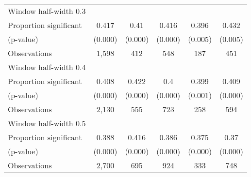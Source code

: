 \begin{tabular}{l*{5}{c}}
\hline
Window half-width 0.3\\

Proportion significant& 0.417 &  0.41 &  0.416 &  0.396 &  0.432\\

(p-value) & (0.000) &  (0.000) &  (0.000) &  (0.005) &  (0.005)\\

Observations& 1,598 &  412 &  548 &  187 &  451\\

\hline
Window half-width 0.4\\

Proportion significant& 0.408 &  0.422 &  0.4 &  0.399 &  0.409\\

(p-value) & (0.000) &  (0.000) &  (0.000) &  (0.001) &  (0.000)\\

Observations& 2,130 &  555 &  723 &  258 &  594\\

\hline
Window half-width 0.5\\

Proportion significant& 0.388 &  0.416 &  0.386 &  0.375 &  0.37\\

(p-value) & (0.000) &  (0.000) &  (0.000) &  (0.000) &  (0.000)\\

Observations& 2,700 &  695 &  924 &  333 &  748\\

\hline\hline
\end{tabular}

